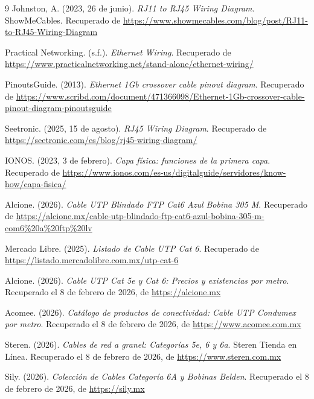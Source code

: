 \documentclass[a4paper,12pt]{article}
\begin{document}
\begin{thebibliography}{9}
    Johnston, A. (2023, 26 de junio). \textit{RJ11 to RJ45 Wiring Diagram}. ShowMeCables. Recuperado de \url{https://www.showmecables.com/blog/post/RJ11-to-RJ45-Wiring-Diagram}

    Practical Networking. (s.f.). \textit{Ethernet Wiring}. Recuperado de \url{https://www.practicalnetworking.net/stand-alone/ethernet-wiring/}

    PinoutsGuide. (2013). \textit{Ethernet 1Gb crossover cable pinout diagram}. Recuperado de \url{https://www.scribd.com/document/471366098/Ethernet-1Gb-crossover-cable-pinout-diagram-pinoutsguide}

    Seetronic. (2025, 15 de agosto). \textit{RJ45 Wiring Diagram}. Recuperado de \url{https://seetronic.com/es/blog/rj45-wiring-diagram/}

    IONOS. (2023, 3 de febrero). \textit{Capa física: funciones de la primera capa}. Recuperado de \url{https://www.ionos.com/es-us/digitalguide/servidores/know-how/capa-fisica/}

    Alcione. (2026). \textit{Cable UTP Blindado FTP Cat6 Azul Bobina 305 M}. Recuperado de \url{https://alcione.mx/cable-utp-blindado-ftp-cat6-azul-bobina-305-m-com6%20a%20ftp%20lv}

    Mercado Libre. (2025). \textit{Listado de Cable UTP Cat 6}. Recuperado de \url{https://listado.mercadolibre.com.mx/utp-cat-6}

    Alcione. (2026). \textit{Cable UTP Cat 5e y Cat 6: Precios y existencias por metro}. Recuperado el 8 de febrero de 2026, de \url{https://alcione.mx}

    Acomee. (2026). \textit{Catálogo de productos de conectividad: Cable UTP Condumex por metro}. Recuperado el 8 de febrero de 2026, de \url{https://www.acomee.com.mx}

    Steren. (2026). \textit{Cables de red a granel: Categorías 5e, 6 y 6a}. Steren Tienda en Línea. Recuperado el 8 de febrero de 2026, de \url{https://www.steren.com.mx}

    Sily. (2026). \textit{Colección de Cables Categoría 6A y Bobinas Belden}. Recuperado el 8 de febrero de 2026, de \url{https://sily.mx}

\end{thebibliography}
\end{document}
